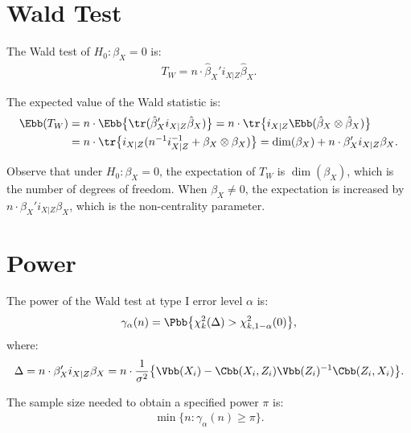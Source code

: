 \section{Wald Test}
The Wald test of $H_{0}:\beta_{X} = 0$ is:
\begin{align*}
T_{W} = n\cdot \hat{\beta}_{X}'i_{X|Z}\hat{\beta}_{X}.
\end{align*}

The expected value of the Wald statistic is:
\begin{align*}
\Ebb(T_{W}) &= n\cdot\Ebb\big\{\tr(\hat{\beta}_{X}'i_{X|Z}\hat{\beta}_{X})\big\} = n\cdot \tr\big\{i_{X|Z}\Ebb(\hat{\beta}_{X} \otimes \hat{\beta}_{X})\big\} \\
&= n\cdot\tr\big\{i_{X|Z}(n^{-1}i_{X|Z}^{-1} + \beta_{X} \otimes \beta_{X})\big\} = \dim(\beta_{X}) + n\cdot\beta_{X}'i_{X|Z}\beta_{X}.
\end{align*}

Observe that under $H_{0}:\beta_{X} = 0$, the expectation of $T_{W}$ is $\dim(\beta_{X})$, which is the number of degrees of freedom. When $\beta_{X} \neq 0$, the expectation is increased by $n\cdot \beta_{X}'i_{X|Z}\beta_{X}$, which is the non-centrality parameter.

\section{Power}
The power of the Wald test at type I error level $\alpha$ is:
\begin{align*}
\gamma_{\alpha}(n) = \Pbb\big\{\chi_{k}^{2}(\Delta) > \chi_{k,1-\alpha}^{2}(0)\big\},
\end{align*}
where:
\begin{align*}
\Delta = n\cdot\beta_{X}'i_{X|Z}\beta_{X} = n\cdot\frac{1}{\sigma^2}\big\{\Vbb(X_{i}) - \Cbb(X_{i}, Z_{i})\Vbb(Z_{i})^{-1}\Cbb(Z_{i}, X_{i})\big\}.
\end{align*}

The sample size needed to obtain a specified power $\pi$ is:
\begin{align*}
\min\big\{n : \gamma_{\alpha}(n) \geq \pi\big\}.
\end{align*}






